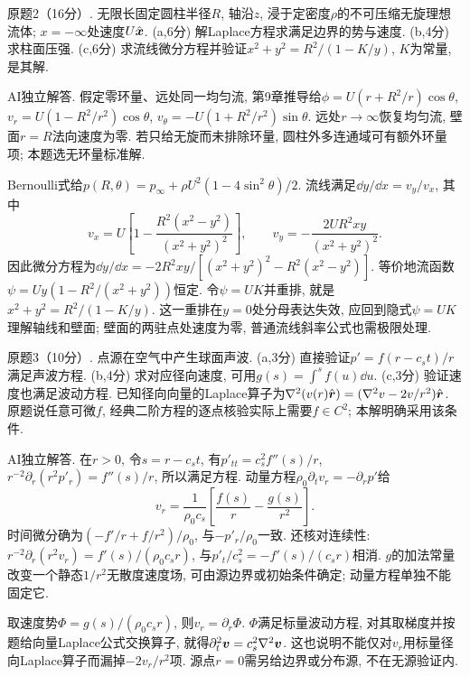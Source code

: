\begin{exercise}
原题2（16分）. 无限长固定圆柱半径$R$, 轴沿$z$, 浸于定密度$\rho$的不可压缩无旋理想流体; $x=-\infty$处速度$U\hat{\boldsymbol{x}}$. (a,6分) 解Laplace方程求满足边界的势与速度. (b,4分) 求柱面压强. (c,6分) 求流线微分方程并验证$x^2+y^2=R^2/(1-K/y)$, $K$为常量, 是其解.
\end{exercise}
\begin{solution}
AI独立解答. 假定零环量、远处同一均匀流, 第9章推导给$\phi=U(r+R^2/r)\cos\theta$, $v_r=U(1-R^2/r^2)\cos\theta$, $v_\theta=-U(1+R^2/r^2)\sin\theta$. 远处$r\to\infty$恢复均匀流, 壁面$r=R$法向速度为零. 若只给无旋而未排除环量, 圆柱外多连通域可有额外环量项; 本题选无环量标准解.

Bernoulli式给$p(R,\theta)=p_\infty+\rho U^2(1-4\sin^2\theta)/2$. 流线满足$\dd y/\dd x=v_y/v_x$, 其中
\[
v_x=U\left[1-\frac{R^2(x^2-y^2)}{(x^2+y^2)^2}\right],\qquad
v_y=-\frac{2UR^2xy}{(x^2+y^2)^2}.
\]
因此微分方程为$\dd y/\dd x=-2R^2xy/[(x^2+y^2)^2-R^2(x^2-y^2)]$. 等价地流函数$\psi=Uy(1-R^2/(x^2+y^2))$恒定. 令$\psi=UK$并重排, 就是$x^2+y^2=R^2/(1-K/y)$. 这一重排在$y=0$处分母表达失效, 应回到隐式$\psi=UK$理解轴线和壁面; 壁面的两驻点处速度为零, 普通流线斜率公式也需极限处理.
\end{solution}

\begin{exercise}
原题3（10分）. 点源在空气中产生球面声波. (a,3分) 直接验证$p'=f(r-c_st)/r$满足声波方程. (b,4分) 求对应径向速度, 可用$g(s)=\int^s f(u)\dd u$. (c,3分) 验证速度也满足波动方程. 已知径向向量的Laplace算子为$\nabla^2(v(r)\hat{\boldsymbol{r}})=(\nabla^2v-2v/r^2)\hat{\boldsymbol{r}}$. 原题说任意可微$f$, 经典二阶方程的逐点核验实际上需要$f\in C^2$; 本解明确采用该条件.
\end{exercise}
\begin{solution}
AI独立解答. 在$r>0$, 令$s=r-c_st$, 有$p'_{tt}=c_s^2f''(s)/r$, $r^{-2}\partial_r(r^2p'_r)=f''(s)/r$, 所以满足方程. 动量方程$\rho_0\partial_tv_r=-\partial_rp'$给
\[
v_r=\frac1{\rho_0c_s}\left[\frac{f(s)}r-\frac{g(s)}{r^2}\right].
\]
时间微分确为$(-f'/r+f/r^2)/\rho_0$, 与$-p'_r/\rho_0$一致. 还核对连续性: $r^{-2}\partial_r(r^2v_r)=f'(s)/(\rho_0c_sr)$, 与$p'_t/c_s^2=-f'(s)/(c_sr)$相消. $g$的加法常量改变一个静态$1/r^2$无散度速度场, 可由源边界或初始条件确定; 动量方程单独不能固定它.

取速度势$\Phi=g(s)/(\rho_0c_sr)$, 则$v_r=\partial_r\Phi$. $\Phi$满足标量波动方程, 对其取梯度并按题给向量Laplace公式交换算子, 就得$\partial_t^2\boldsymbol{v}=c_s^2\nabla^2\boldsymbol{v}$. 这也说明不能仅对$v_r$用标量径向Laplace算子而漏掉$-2v_r/r^2$项. 源点$r=0$需另给边界或分布源, 不在无源验证内.
\end{solution}

